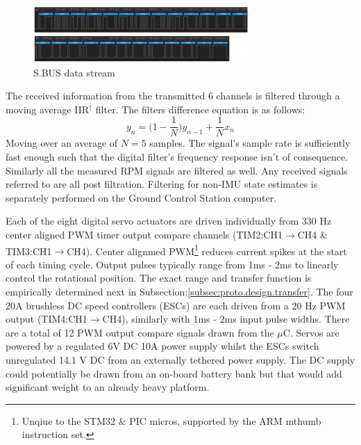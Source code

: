 \begin{figure}[hbtp]
\centering
\includegraphics[width=\textwidth]{figs/sbus}
\caption{S.BUS data stream}
\label{fig:sbus}
\vspace{-10pt}
\end{figure}
\par
{\color{red}
The received information from the transmitted 6 channels is filtered through a moving average IIR$^\dagger$ filter. The filters difference equation is as follows: 
\begin{equation}
y_n = \big(1-\frac{1}{N}\big)y_{n-1}+\frac{1}{N}x_n
\end{equation}
Moving over an average of $N=5$ samples. The signal's sample rate is sufficiently fast enough such that the digital filter's frequency response isn't of consequence. Similarly all the measured RPM signals are filtered as well. Any received signals referred to are all post filtration. Filtering for non-IMU state estimates is separately performed on the Ground Control Station computer.}
\par
Each of the eight digital servo actuators are driven individually from 330 Hz center aligned PWM timer output compare channels (TIM2:CH1$\rightarrow$CH4 \& TIM3:CH1$\rightarrow$CH4). Center alignmed PWM\footnote{Unqiue to the STM32 \& PIC micros, supported by the ARM mthumb instruction set.} reduces current spikes at the start of each timing cycle. Output pulses typically range from 1ms - 2ms to linearly control the rotational position. The exact range and transfer function is empirically determined next in Subsection:\ref{subsec:proto.design.transfer}. The four 20A brushless DC speed controllers (ESCs) are each driven from a 20 Hz PWM output (TIM4:CH1$\rightarrow$CH4), similarly with 1ms - 2ms input pulse widths. There are a total of 12 PWM output compare signals drawn from the $\mu$C. Servos are powered by a regulated 6V DC 10A power supply \cite{rotorstar} whilst the ESCs switch unregulated 14.1 V DC from an externally tethered power supply. The DC supply could potentially be drawn from an on-board battery bank but that would add significant weight to an already heavy platform.
\par

